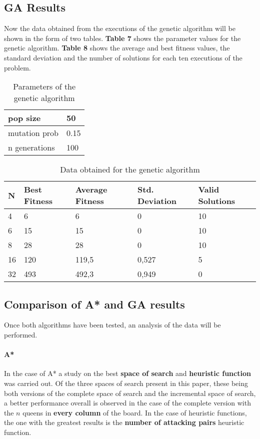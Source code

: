 \documentclass[]{llncs}
\begin{document}
\subsection{GA Results}\label{gen_results}
Now the data obtained from the executions of the genetic algorithm will be shown in the form of two tables. \textbf{Table 7} shows the parameter values for the genetic algorithm. \textbf{Table 8} shows the average and best fitness values, the standard deviation and the number of solutions for each ten executions of the problem.

\begin{table}[]
\centering
\begin{tabular}{l|l}
pop size      & 50   \\ \hline
mutation prob & 0.15 \\ \hline
n generations & 100 
\end{tabular}
\caption{Parameters of the genetic algorithm}
\label{tab:ag-parameters}
\end{table}

\begin{table}[]
\centering
\begin{tabular}{lllll}
N  & Best Fitness & Average Fitness & Std. Deviation & Valid Solutions      \\ \hline
4  & 6            & 6               & 0              & 10                   \\
6  & 15           & 15              & 0              & 10                   \\
8  & 28           & 28              & 0              & 10                   \\
16 & 120          & 119,5           & 0,527          & 5                    \\
32 & 493          & 492,3           & 0,949          & 0
\end{tabular}
\caption{Data obtained for the genetic algorithm}
\label{tab:ag-data}
\end{table}
\subsection{Comparison of A* and GA results}\label{comparison_astar_gen}
Once both algorithms have been tested, an analysis of the data will be performed.

\paragraph{A*} 
In the case of A* a study on the best \textbf{space of search} and \textbf{heuristic function} was carried out. Of the three spaces of search present in this paper, these being both versions of the complete space of search and the incremental space of search, a better performance overall is observed in the case of the complete version with the $n$ queens in \textbf{every column} of the board. In the case of heuristic functions, the one with the greatest results is the \textbf{number of attacking pairs} heuristic function.
\end{document}
